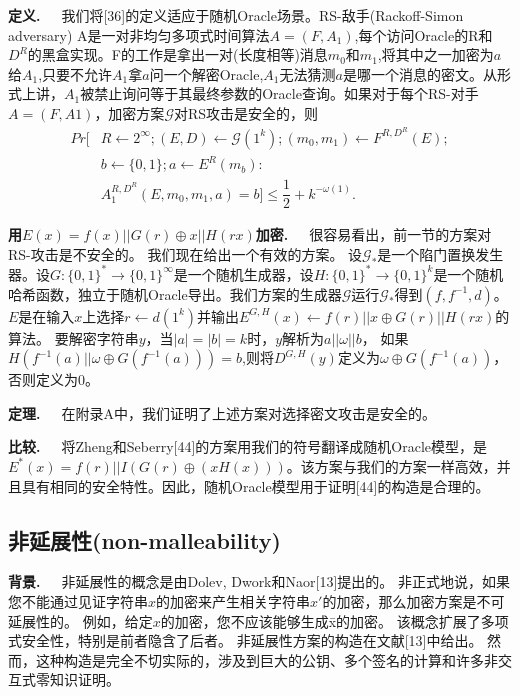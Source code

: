 \documentclass[]{article}
\begin{document}
    \textbf{定义.}\ \ \ 
    我们将[36]的定义适应于随机Oracle场景。RS-敌手(Rackoff-Simon adversary) A是一对非均匀多项式时间算法$A=(F,A_1)$,每个访问Oracle的R和$D^R$的黑盒实现。F的工作是拿出一对(长度相等)消息$m_0$和$m_1$,将其中之一加密为$a$给$A_1$,只要不允许$A_1$拿$a$问一个解密Oracle,$A_1$无法猜测$a$是哪一个消息的密文。从形式上讲，$A_1$被禁止询问等于其最终参数的Oracle查询。如果对于每个RS-对手$A=(F, A1)$，加密方案$\mathcal{G}$对RS攻击是安全的，则
    \begin{align*}
    	Pr[&R\leftarrow 2^\infty;(E,D)\leftarrow \mathcal{G}(1^k);(m_0,m_1)\leftarrow F^{R,D^R}(E);\\
    	   &b\leftarrow\{0,1\};a\leftarrow E^R(m_b):\\
    	   &A_1^{R,D^R}(E,m_0,m_1,a)=b]\leq \dfrac{1}{2}+k^{-\omega(1)}.
    \end{align*}
    
    \textbf{用$E(x)=f(x)||G(r)\oplus x ||H(rx)$加密.}\ \ \ 
    很容易看出，前一节的方案对RS-攻击是不安全的。
    我们现在给出一个有效的方案。
    设$\mathcal{G}_*$是一个陷门置换发生器。设$G:\{0,1\}^*\rightarrow \{0,1\}^\infty$是一个随机生成器，设$H:\{0,1\}^*\rightarrow \{0,1\}^k$是一个随机哈希函数，独立于随机Oracle导出。我们方案的生成器$\mathcal{G}$运行$\mathcal{G}_*$得到$(f,f^{-1},d)$。
    $E$是在输入$x$上选择$r\leftarrow d(1^k)$并输出$E^{G,H}(x)\leftarrow f(r)||x\oplus G(r)||H(rx)$的算法。
    要解密字符串$y$，当$|a|=|b|=k$时，$y$解析为$a||\omega || b$，
    如果$H(f^{-1}(a)||\omega \oplus G(f^{-1}(a)))=b$,则将$D^{G,H}(y)$定义为$\omega \oplus G(f^{-1}(a))$，否则定义为0。

    
    \textbf{定理.}\ \ \ 
    在附录A中，我们证明了上述方案对选择密文攻击是安全的。


    \textbf{比较.}\ \ \ 
    将Zheng和Seberry[44]的方案用我们的符号翻译成随机Oracle模型，是$E^*(x) = f(r) ||I (G(r) \oplus (xH(x)))$。该方案与我们的方案一样高效，并且具有相同的安全特性。因此，随机Oracle模型用于证明[44]的构造是合理的。
    
    
    \subsection{非延展性(non-malleability)}
    \textbf{背景.}\ \ \ 
    非延展性的概念是由Dolev, Dwork和Naor[13]提出的。
    非正式地说，如果您不能通过见证字符串$x$的加密来产生相关字符串$x'$的加密，那么加密方案是不可延展性的。
    例如，给定$x$的加密，您不应该能够生成\={x}的加密。
    该概念扩展了多项式安全性，特别是前者隐含了后者。
    非延展性方案的构造在文献[13]中给出。
    然而，这种构造是完全不切实际的，涉及到巨大的公钥、多个签名的计算和许多非交互式零知识证明。
    
\end{document}
